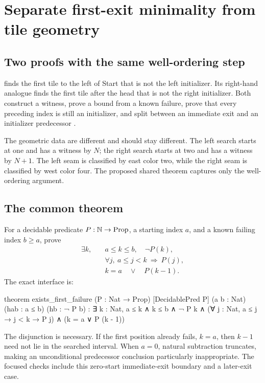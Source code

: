 \section{Separate first-exit minimality from tile geometry}
\label{sec:firstexit}

\subsection{Two proofs with the same well-ordering step}

 finds the first tile to
the left of Start that is not the left initializer. Its right-hand analogue
finds the first tile after the head that is not the right initializer.
Both construct a  witness, prove a bound from a known
failure, prove that every preceding index is still an initializer, and
split between an immediate exit and an initializer predecessor
\cite{strip}.

The geometric data are different and should stay different. The left
search starts at one and has a witness by \(N\); the right search starts at
two and has a witness by \(N+1\). The left seam is classified by east color
two, while the right seam is classified by west color four. The proposed
shared theorem captures only the well-ordering argument.

\subsection{The common theorem}

For a decidable predicate \(P:\mathbb N\to\mathrm{Prop}\), a starting index
\(a\), and a known failing index \(b\ge a\), prove
\[
\begin{split}
\exists k,\quad &a\le k\le b,\quad \neg P(k),\\
&\forall j,\ a\le j<k\ \Longrightarrow\ P(j),\\
&k=a\quad\lor\quad P(k-1).
\end{split}
\]
The exact interface is:
\begin{lean}
theorem exists_first_failure (P : Nat → Prop) [DecidablePred P]
    (a b : Nat) (hab : a ≤ b) (hb : ¬ P b) :
    ∃ k : Nat, a ≤ k ∧ k ≤ b ∧ ¬ P k ∧
      (∀ j : Nat, a ≤ j → j < k → P j) ∧
      (k = a ∨ P (k - 1))
\end{lean}

The disjunction is necessary. If the first position already fails,
\(k=a\), then \(k-1\) need not lie in the searched interval. When
\(a=0\), natural subtraction truncates, making an unconditional
predecessor conclusion particularly inappropriate. The focused checks
include this zero-start immediate-exit boundary and a later-exit case.

